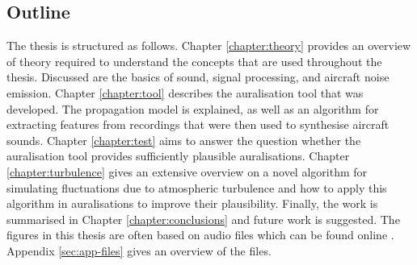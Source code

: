 %
%
%

\subsection{Outline}
The thesis is structured as follows.
\newline
\newline
Chapter \ref{chapter:theory} provides an overview of theory required to
understand the concepts that are used throughout the thesis. Discussed are the
basics of sound, signal processing, and aircraft noise emission.
\newline
\newline
Chapter \ref{chapter:tool} describes the auralisation tool that was developed.
The propagation model is explained, as well as an algorithm for extracting
features from recordings that were then used to synthesise aircraft sounds.
\newline
\newline
Chapter \ref{chapter:test} aims to answer the question whether the auralisation
tool provides sufficiently plausible auralisations.
\newline
\newline
Chapter \ref{chapter:turbulence} gives an extensive overview on a novel
algorithm for simulating fluctuations due to atmospheric turbulence and how to
apply this algorithm in auralisations to improve their plausibility.
\newline
\newline
Finally, the work is summarised in Chapter \ref{chapter:conclusions} and future
work is suggested.
\newline
\newline
The figures in this thesis are often based on audio files which can be found online \cite{Rietdijk2017e}.
Appendix \ref{sec:app-files} gives an overview of the files.

